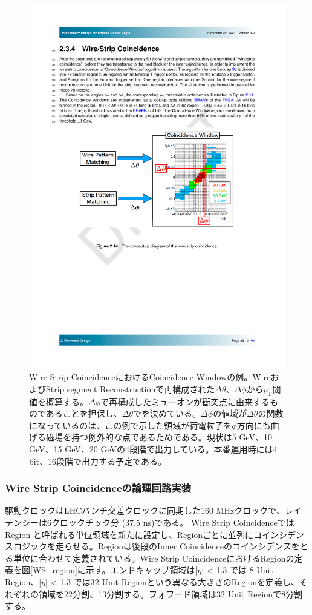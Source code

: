\begin{figure} 
\centering
\includegraphics[width=16cm]{fig/SL/Concept_WS.pdf}
\caption[Wire Strip CoincidenceにおけるCoincidence Windowの例]{Wire Strip CoincidenceにおけるCoincidence Windowの例\cite{SLPDR}。WireおよびStrip segment Reconstructionで再構成された$\Delta\theta$、$\Delta\phi$から$p_\mathrm{T}$閾値を概算する。$\Delta\phi$で再構成したミューオンが衝突点に由来するものであることを担保し、$\Delta\theta$で\pt を決めている。$\Delta\phi$の値域が$\Delta\theta$の関数になっているのは、この例で示した領域が荷電粒子を$\phi$方向にも曲げる磁場を持つ例外的な点であるためである。現状\pt は5 GeV、10 GeV、15 GeV、20 GeVの4段階で出力している。本番運用時には4 bit、16段階で出力する予定である。}
\label{Concept_WS}
\end{figure}

\subsubsection*{Wire Strip Coincidenceの論理回路実装}
駆動クロックはLHCバンチ交差クロックに同期した160 MHzクロックで、レイテンシーは6クロックチック分 (37.5 ns)である。
Wire Strip Coincidenceでは Region と呼ばれる単位領域を新たに設定し、Regionごとに並列にコインシデンスロジックを走らせる。Regionは後段のInner Coincidenceのコインシデンスをとる単位に合わせて定義されている。Wire Strip CoincidenceにおけるRegionの定義を図\ref{WS_region}に示す。エンドキャップ領域は|$\eta$| < 1.3 では 8 Unit Region、|$\eta$| < 1.3 では32 Unit Regionという異なる大きさのRegionを定義し、それぞれの領域を22分割、13分割する。フォワード領域は32 Unit Regionで8分割する。

